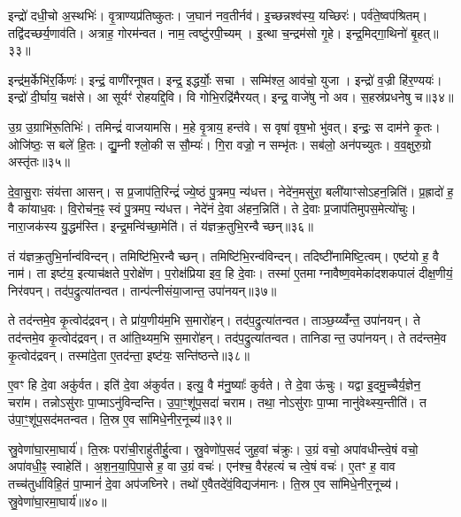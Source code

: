 इन्द्रो॑ दधी॒चो अ॒स्थभिः॑।
वृ॒त्राण्यप्र॑तिष्कुतः।
ज॒घान॑ नव॒तीर्नव॑।
इ॒च्छन्नश्व॑स्य॒ यच्छिरः॑।
पर्व॑ते॒ष्वप॑श्रितम्।
तद्वि॑दच्छर्य॒णाव॑ति।
अत्राह॒ गोरम॑न्वत।
नाम॒ त्वष्टु॑रपी॒च्यम्।
इ॒त्था च॒न्द्रम॑सो गृ॒हे।
इन्द्र॒मिद्गा॒थिनो॑ बृ॒हत्॥३३॥

इन्द्र॑म॒र्केभि॑र॒र्किणः॑।
इन्द्रं॒ वाणी॑रनूषत।
इन्द्र॒ इद्धर्योः॒ सचा।
सम्मि॑श्ल॒ आव॑चो॒ युजा।
इन्द्रो॑ व॒ज्री हि॑र॒ण्ययः॑।
इन्द्रो॑ दी॒र्घाय॒ चक्ष॑से।
आ सूर्यꣳ॑ रोहयद्दि॒वि।
वि गोभि॒रद्रि॑मैरयत्।
इन्द्र॒ वाजे॑षु नो अव।
स॒हस्र॑प्रधनेषु च॥३४॥

उ॒ग्र उ॒ग्राभि॑रू॒तिभिः॑।
तमिन्द्रं॑ वाजयामसि।
म॒हे वृ॒त्राय॒ हन्त॑वे।
स वृषा॑ वृष॒भो भु॑वत्।
इन्द्रः॒ स दाम॑ने कृ॒तः।
ओजि॑ष्ठः॒ स बले॑ हि॒तः।
द्यु॒म्नी श्लो॒की स सौ॒म्यः॑।
गि॒रा वज्रो॒ न सम्भृ॑तः।
सब॑लो॒ अन॑पच्युतः।
व॒व॒क्षुरु॒ग्रो अस्तृ॑तः॥३५॥\anuvakamend[बृ॒हच्चास्तृ॑तः]

दे॒वा॒सु॒राः संय॑त्ता आसन्।
स प्र॒जाप॑ति॒रिन्द्रं॑ ज्ये॒ष्ठं पु॒त्रमप॒ न्य॑धत्त।
नेदे॑न॒मसु॑रा॒ बली॑याꣳसो\-ऽहन॒न्निति॑।
प्र॒ह्रादो॑ ह॒ वै का॑याध॒वः।
वि॒रोच॑न॒ꣴ॒ स्वं पु॒त्रमप॒ न्य॑धत्त।
नेदे॑नं दे॒वा अ॑हन॒न्निति॑।
ते दे॒वाः प्र॒जाप॑तिमुपस॒मेत्यो॑चुः।
नारा॒जक॑स्य यु॒द्धम॑स्ति।
इन्द्र॒मन्वि॑च्छा॒मेति॑।
तं य॑ज्ञक्र॒तुभि॒रन्वैच्छन्॥३६॥

तं य॑ज्ञक्र॒तुभि॒र्नान्व॑विन्दन्।
तमिष्टि॑भि॒रन्वैच्छन्।
तमिष्टि॑भि॒रन्व॑\-विन्दन्।
तदिष्टी॑नामिष्टि॒त्वम्।
एष्ट॑यो ह॒ वै नाम॑।
ता इष्ट॑य॒ इत्याच॑क्षते प॒रोक्षे॑ण।
प॒रोक्ष॑प्रिया इव॒ हि दे॒वाः।
तस्मा॑ ए॒तमाग्नावैष्ण॒वमेका॑दशकपालं दीक्ष॒णीयं॒ निर॑वपन्।
तद॑प॒द्रुत्या॑तन्वत।
तान्प॑त्नीसंया॒जान्त॒ उपा॑नयन्॥३७॥

ते तद॑न्तमे॒व कृ॒त्वोद॑द्रवन्।
ते प्रा॑य॒णीय॑म॒भि स॒मारो॑हन्।
तद॑प॒द्रुत्या॑\-तन्वत।
ताञ्छ॒य्य्वँ॑न्त॒ उपा॑नयन्।
ते तद॑न्तमे॒व कृ॒त्वोद॑द्रवन्।
त आ॑ति॒थ्यम॒भि स॒मारो॑हन्।
तद॑प॒द्रुत्या॑\-तन्वत।
तानिडान्त॒ उपा॑नयन्।
ते तद॑न्तमे॒व कृ॒त्वोद॑द्रवन्।
तस्मा॑दे॒ता ए॒तद॑न्ता॒ इष्ट॑यः॒ सन्ति॑ष्ठन्ते॥३८॥

ए॒वꣳ हि दे॒वा अकु॑र्वत।
इति॑ दे॒वा अ॑कुर्वत।
इत्यु॒ वै म॑नु॒ष्याः᳚ कुर्वते।
ते दे॒वा ऊ॑चुः।
यद्वा इ॒दमु॒च्चैर्य॒ज्ञेन॒ चरा॑म।
तन्नो\-ऽसु॑राः पा॒प्मा\-ऽनु॑विन्दन्ति।
उ॒पा॒ꣳ॒शू॑प॒सदा॑ चराम।
तथा॒ नोऽसु॑राः पा॒प्मा नानु॑वेथ्स्य॒न्तीति॑।
त उ॑पा॒ꣳ॒शू॑प॒सद॑मतन्वत।
ति॒स्र ए॒व सा॑मिधे॒नीर॒नूच्य॑॥३९॥

स्रु॒वेणा॑घा॒रमा॒घार्य॑।
ति॒स्रः परा॑ची॒राहु॑तीर्\mbox{}हु॒त्वा।
स्रु॒वेणो॑प॒सदं॑ जुह॒वां च॑क्रुः।
उ॒ग्रं वचो॒ अपा॑वधीन्त्वे॒षं वचो॒ अपा॑वधी॒ꣴ॒ स्वाहेति॑।
अ॒श॒न॒या॒पि॒पा॒से ह॒ वा उ॒ग्रं वचः॑।
एन॑श्च॒ वैर॑हत्यं च त्वे॒षं वचः॑।
ए॒तꣳ ह॒ वाव तच्च॑तुर्धाविहि॒तं पा॒प्मानं॑ दे॒वा अप॑जघ्निरे।
तथो॑ ए॒वैतदे॑वं॒विद्यज॑मानः।
ति॒स्र ए॒व सा॑मिधे॒नीर॒नूच्य॑।
स्रु॒वेणा॑घा॒रमा॒घार्य॑॥४०॥

